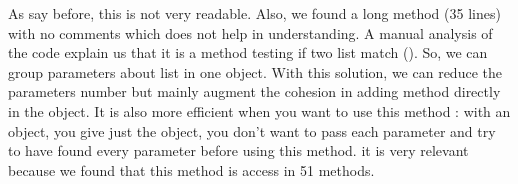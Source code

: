 As say before, this is not very readable.  Also, we found a long method (35 lines) with no comments which does not help in understanding.  A manual analysis of the code explain us that it is a method testing if two list match ().  So, we can group parameters about list in one object.  With this solution, we can reduce the parameters number but mainly augment the cohesion in adding method directly in the object.  It is also more efficient when you want to use this method : with an object, you give just the object, you don't want to pass each parameter and try to have found every parameter before using this method.  it is very relevant because we found that this method is access in 51 methods.\\




